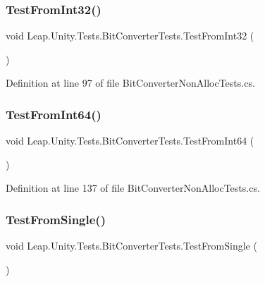 \subsubsection{\texorpdfstring{TestFromInt32()}{TestFromInt32()}}
{\footnotesize\ttfamily void Leap.\+Unity.\+Tests.\+Bit\+Converter\+Tests.\+Test\+From\+Int32 (\begin{DoxyParamCaption}{ }\end{DoxyParamCaption})}



Definition at line 97 of file Bit\+Converter\+Non\+Alloc\+Tests.\+cs.

\mbox{\label{class_leap_1_1_unity_1_1_tests_1_1_bit_converter_tests_a5fb887344c07c258e439cfc2ff349af8}} 
\subsubsection{\texorpdfstring{TestFromInt64()}{TestFromInt64()}}
{\footnotesize\ttfamily void Leap.\+Unity.\+Tests.\+Bit\+Converter\+Tests.\+Test\+From\+Int64 (\begin{DoxyParamCaption}{ }\end{DoxyParamCaption})}



Definition at line 137 of file Bit\+Converter\+Non\+Alloc\+Tests.\+cs.

\mbox{\label{class_leap_1_1_unity_1_1_tests_1_1_bit_converter_tests_a828348650fb61975c8ff55e2afb20b4b}} 
\subsubsection{\texorpdfstring{TestFromSingle()}{TestFromSingle()}}
{\footnotesize\ttfamily void Leap.\+Unity.\+Tests.\+Bit\+Converter\+Tests.\+Test\+From\+Single (\begin{DoxyParamCaption}{ }\end{DoxyParamCaption})}



